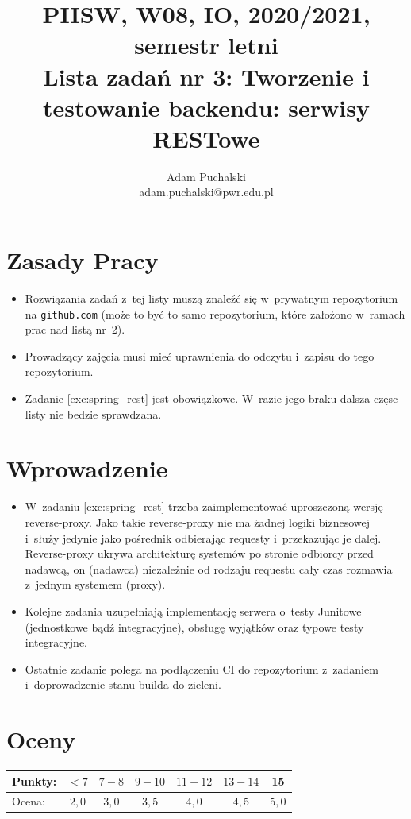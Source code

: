 \documentclass[12pt]{article}
\title{PIISW, W08, IO, 2020/2021, semestr letni\\Lista zadań nr 3: Tworzenie i testowanie backendu: serwisy RESTowe}
\author{Adam Puchalski\\ \small adam.puchalski@pwr.edu.pl}
\begin{document}
    \maketitle

    \section*{Zasady Pracy}
    \begin{itemize}
        \item Rozwiązania zadań z~tej listy muszą znaleźć się w~prywatnym repozytorium na \texttt{github.com} (może to być to samo repozytorium, które założono w~ramach prac nad listą nr~2).
        \item Prowadzący zajęcia musi mieć uprawnienia do odczytu i~zapisu do tego repozytorium.
        \item Zadanie \ref{exc:spring_rest} jest obowiązkowe. W~razie jego braku dalsza częsc listy nie bedzie sprawdzana.
    \end{itemize}

\section*{Wprowadzenie}
\begin{itemize}
        \item  W~zadaniu \ref{exc:spring_rest} trzeba zaimplementować uproszczoną wersję reverse-proxy. Jako takie reverse-proxy nie ma żadnej logiki biznesowej i~służy jedynie jako pośrednik odbierając requesty i~przekazując je dalej. Reverse-proxy ukrywa architekturę systemów po stronie odbiorcy przed nadawcą, on (nadawca) niezależnie od rodzaju requestu cały czas rozmawia z~jednym systemem (proxy).
        \item Kolejne zadania uzupełniają implementację serwera o~testy Junitowe (jednostkowe bądź integracyjne), obsługę wyjątków oraz typowe testy integracyjne.
        \item Ostatnie zadanie polega na podłączeniu CI do repozytorium z~zadaniem i~doprowadzenie stanu builda do zieleni.
\end{itemize}

    \section*{Oceny}
    \begin{tabular}{|l|c|c|c|c|c|c|}
        \hline
        Punkty: & $<7$ & $7-8$ & $9-10$ & $11-12$ & $13-14$ & 15\\
        \hline
        Ocena:  & $2,0$ & $3,0$ & $3,5$ & $4,0$ & $4,5$ & $5,0$\\
        \hline
    \end{tabular}
\end{document}
